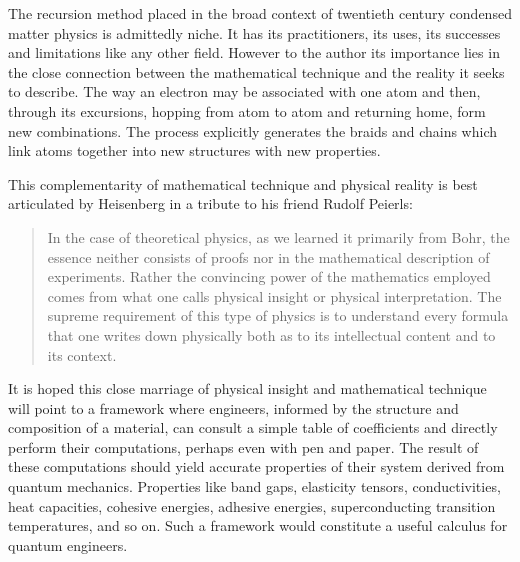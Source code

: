 The recursion method placed in the broad context of twentieth century condensed matter physics
is admittedly niche. It has its practitioners, its uses, 
its successes and limitations like any other field.
However to the author its importance lies in the close connection between the mathematical
technique and the reality it seeks to describe. The way an electron may be associated with 
one atom and then, through its excursions, hopping from atom to atom and returning home,
form new combinations. The process explicitly generates the braids and chains which link atoms 
together into new structures with new properties.

%

This complementarity of mathematical technique and physical reality 
is best articulated by Heisenberg in a tribute to his friend Rudolf Peierls:
 
\begin{quote}
In the case of theoretical physics, as we learned it primarily from
Bohr, the essence neither consists of proofs
nor in the mathematical description of experiments.
Rather the convincing power of the mathematics employed comes from
what one calls physical insight or physical interpretation. The supreme
requirement of this type of physics is to understand every formula that
one writes down physically both as to its intellectual content and to its context.
\end{quote}
 
It is hoped this close marriage of physical insight and mathematical technique
will point to a framework where engineers, informed by the
structure and composition of a material, can consult a simple table of
coefficients and directly perform their computations, perhaps even with 
pen and paper. The result of these computations should yield accurate 
properties of their system derived from quantum mechanics.
Properties like band gaps, elasticity tensors, conductivities, 
heat capacities, cohesive energies, adhesive energies, superconducting transition temperatures, 
and so on. Such a framework would constitute a useful calculus for quantum engineers.
